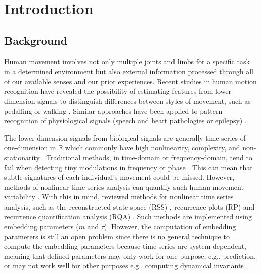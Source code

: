 
\chapter{Introduction} \label{chapter1}


\graphicspath{{figs/chapter1/PDF/}}



\section{Background}
Human movement involves not only multiple
joints and limbs for a specific task in a determined environment
but also external information processed through all of our available 
senses and our prior experiences. 
Recent studies in human motion recognition have revealed the possibility 
of estimating features from lower dimension signals to distinguish 
differences between styles of movement, such as pedalling 
\citep{Quintana-Duque2012, Quintana-Duque2016} or walking 
\citep{sama2013, frank2010}. 
Similar approaches have been applied to pattern recognition of 
physiological signals (speech and heart pathologies or epilepsy) 
\citep{gomezgarcia2014}.

The lower dimension signals from biological signals are generally time series 
of one-dimension in $\mathbb{R}$ which commonly have high nonlinearity, 
complexity, and non-stationarity 
\citep{gomezgarcia2014, huffaker2017, caballero2014}.
Traditional methods, in time-domain or frequency-domain, 
tend to fail when detecting tiny modulations in frequency or phase 
\citep{marwan2011}. This can mean that subtle signatures of each 
individual's movement could be missed. However, methods of nonlinear 
time series analysis can quantify such human movement variability 
\citep{Quintana-Duque2012, Quintana-Duque2016, sama2013, 
frank2010, gomezgarcia2014, marwan2011, stergiou2011, packard1980}.
With this in mind, \cite{bradley2015} reviewed methods for
nonlinear time series analysis, such as the reconstructed state space 
(RSS) \citep{takens1981}, recurrence plots (RP) \citep{eckmann1987} and
recurrence quantification analysis (RQA) \citep{zbilut1992}.
Such methods are implemented using embedding parameters ($m$ and $\tau$).
However, the computation of embedding parameters is still an open problem
since there is no general technique to compute the embedding parameters 
because time series are system-dependent, meaning that defined parameters
may only work for one purpose, e.g., prediction, or may not work well 
for other purposes e.g., computing dynamical invariants \citep{bradley2015}.

